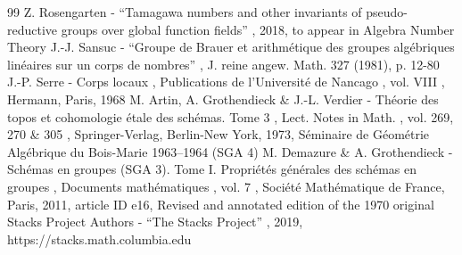 \documentclass[11pt]{article}
\theoremstyle{plain}
\theoremstyle{definition}
\begin{document}
\begin{thebibliography}{99}
 Z. Rosengarten - “Tamagawa numbers and other invariants of pseudo-reductive groups over global function fields” , 2018, to appear in Algebra Number Theory
 J.-J. Sansuc - “Groupe de Brauer et arithmétique des groupes algébriques linéaires sur un corps de nombres” , J. reine angew. Math. 327 (1981), p. 12-80
 J.-P. Serre - Corps locaux , Publications de l’Université de Nancago , vol. VIII , Hermann, Paris, 1968
 M. Artin, A. Grothendieck \& J.-L. Verdier - Théorie des topos et cohomologie étale des schémas. Tome 3 , Lect. Notes in Math. , vol. 269, 270 \& 305 , Springer-Verlag, Berlin-New York, 1973, Séminaire de Géométrie Algébrique du Bois-Marie 1963–1964 (SGA 4)
 M. Demazure \& A. Grothendieck - Schémas en groupes (SGA 3). Tome I. Propriétés générales des schémas en groupes , Documents mathématiques , vol. 7 , Société Mathématique de France, Paris, 2011, article ID e16, Revised and annotated edition of the 1970 original
 Stacks Project Authors - “The Stacks Project” , 2019, https://stacks.math.columbia.edu
\end{thebibliography}
\end{document}
